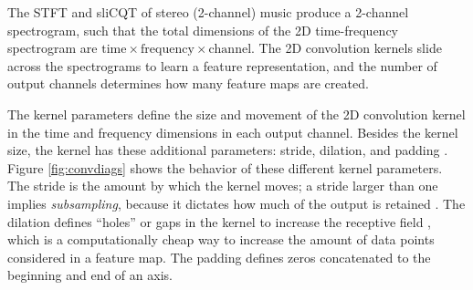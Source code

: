 \documentclass[report.tex]{subfiles}
\begin{document}
The STFT and sliCQT of stereo (2-channel) music produce a 2-channel spectrogram, such that the total dimensions of the 2D time-frequency spectrogram are $\text{time} \times \text{frequency} \times \text{channel}$. The 2D convolution kernels slide across the spectrograms to learn a feature representation, and the number of output channels determines how many feature maps are created. 

The kernel parameters define the size and movement of the 2D convolution kernel in the time and frequency dimensions in each output channel. Besides the kernel size, the kernel has these additional parameters: stride, dilation, and padding \parencite{convguide}. Figure \ref{fig:convdiags} shows the behavior of these different kernel parameters. The stride is the amount by which the kernel moves; a stride larger than one implies \textit{subsampling}, because it dictates how much of the output is retained \parencite{convguide}. The dilation defines ``holes'' or gaps in the kernel to increase the receptive field \parencite{convguide}, which is a computationally cheap way to increase the amount of data points considered in a feature map. The padding defines zeros concatenated to the beginning and end of an axis.
\end{document}
